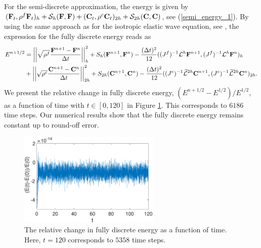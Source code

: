 For the semi-discrete approximation, the energy is given by $({\bf F}_t,{\rho}^f{\bf F}_t)_h + \mathcal{S}_h({\bf F},{\bf F}) + ({\bf C}_t,{\rho}^{c}{\bf C}_t)_{2h} + \mathcal{S}_{2h}({\bf C},{\bf C})$, see (\ref{semi_energy_1}). By using the same approach as for the isotropic elastic wave equation, see \cite{petersson2015wave,sjogreen2012fourth},  the expression for the fully discrete energy reads as
\begin{align*}
E^{n+1/2} &= \left|\left|\sqrt{{\rho}^f}\frac{{\bf F}^{n+1}-{\bf F}^n}{\Delta t}\right|\right|_h^2 + S_h({\bf F}^{n+1},{\bf F}^n) - \frac{(\Delta t)^2}{12}((J^f)^{-1}\mathcal{L}^h{\bf F}^{n+1},(J^f)^{-1}\mathcal{L}^h{\bf F}^n)_h\\
&+ \left|\left|\sqrt{{\rho}^{c}}\frac{{\bf C}^{n+1}-{\bf C}^n}{\Delta t}\right|\right|_{2h}^2 + S_{2h}({\bf C}^{n+1},{\bf C}^n) - \frac{(\Delta t)^2}{12}((J^c)^{-1}\widetilde{\mathcal{L}}^{2h}{\bf C}^{n+1},(J^c)^{-1}\widetilde{\mathcal{L}}^{2h}{\bf C}^n)_{2h}.
\end{align*}
We present the relative change in fully discrete energy, $(E^{n+1/2}-E^{1/2})/E^{1/2}$, as a function of time with $t\in[0,120]$ in Figure \ref{discrete_energy}. This corresponds to $6186$ time steps. Our numerical results show that the fully discrete energy remains constant up to round-off error.
\begin{figure}[htbp]
	\centering
	\includegraphics[width=0.6\textwidth,trim={0cm 0cm 0cm 0cm}, clip]{discrete_energy.eps}
	\caption{The relative change in fully discrete energy as a function of time. Here, $t = 120$ corresponds to $5358$ time steps.}\label{discrete_energy}
\end{figure}


